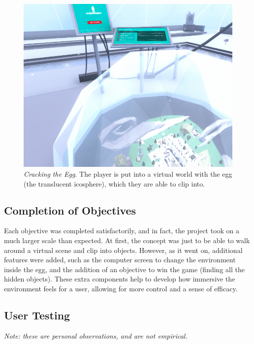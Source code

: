 \documentclass[10pt,twocolumn,letterpaper]{article}
\begin{document}
\begin{figure}[t]
\begin{center}
\includegraphics[width=1.0\linewidth]{images/crackingtheegg.png}
\end{center}
   \caption{\textit{Cracking the Egg}.  The player is put into a virtual world with the egg (the translucent icosphere), which they are able to clip into. }
\label{fig:long}
\label{fig:onecol}
\end{figure}

\subsection{Completion of Objectives}

Each objective was completed satisfactorily, and in fact, the project took on a much larger scale than expected. At first, the concept was just to be able to walk around a virtual scene and clip into objects. However, as it went on, additional features were added, such as the computer screen to change the environment inside the egg, and the addition of an objective to win the game (finding all the hidden objects). These extra components help to develop how immersive the environment feels for a user, allowing for more control and a sense of efficacy.

\subsection{User Testing}

\textit{Note: these are personal observations, and are not empirical.}\\
\end{document}
